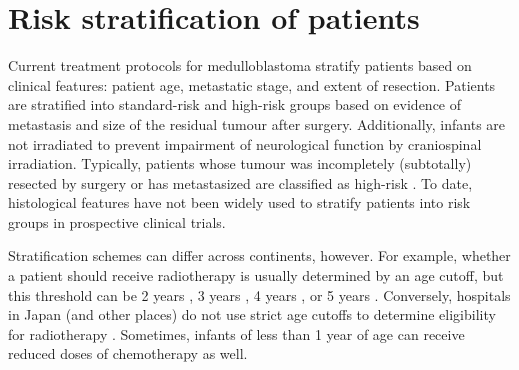 %
%
%
%


\section{Risk stratification of patients}

Current treatment protocols for medulloblastoma stratify patients based on clinical features: patient age, metastatic stage, and extent of resection. Patients are stratified into standard-risk and high-risk groups based on evidence of metastasis and size of the residual tumour after surgery. Additionally, infants are not irradiated to prevent impairment of neurological function by craniospinal irradiation. Typically, patients whose tumour was incompletely (subtotally) resected by surgery or has metastasized are classified as high-risk . To date, histological features have not been widely used to stratify patients into risk groups in prospective clinical trials.

Stratification schemes can differ across continents, however. For example, whether a patient should receive radiotherapy is usually determined by an age cutoff, but this threshold can be 2 years , 3 years , 4 years , or 5 years . Conversely, hospitals in Japan (and other places) do not use strict age cutoffs to determine eligibility for radiotherapy  . Sometimes, infants of less than 1 year of age can receive reduced doses of chemotherapy as well.


